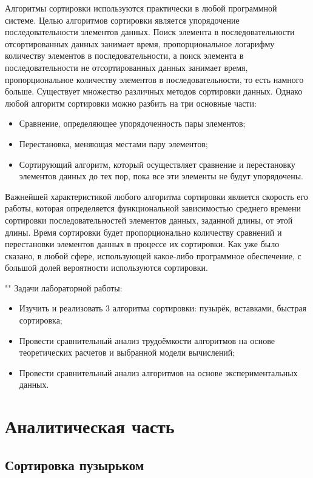 \documentclass[12pt]{report}
\begin{document}
Алгоритмы сортировки используются практически в любой программной системе. Целью алгоритмов сортировки является упорядочение последовательности элементов данных. Поиск элемента в последовательности отсортированных данных занимает время, пропорциональное логарифму количеству элементов в последовательности, а поиск элемента в последовательности не отсортированных данных занимает время, пропорциональное количеству элементов в последовательности, то есть намного больше. Существует множество различных методов сортировки данных. Однако любой алгоритм сортировки можно разбить на три основные части:

\begin{itemize}
	\item Сравнение, определяющее упорядоченность пары элементов;
	\item Перестановка, меняющая местами пару элементов;
	\item Сортирующий алгоритм, который осуществляет сравнение и перестановку элементов данных до тех пор, пока все эти элементы не будут упорядочены.
\end{itemize}

Важнейшей характеристикой любого алгоритма сортировки является скорость его работы, которая определяется функциональной зависимостью среднего времени сортировки последовательностей элементов данных, заданной длины, от этой длины. Время сортировки будет пропорционально количеству сравнений и перестановки элементов данных в процессе их сортировки. Как уже было сказано, в любой сфере, использующей какое-либо программное обеспечение, с большой долей вероятности используются сортировки.  

""\newline
Задачи лабораторной работы:
\begin{itemize}
	\item Изучить и реализовать 3 алгоритма сортировки: пузырёк, вставками, быстрая сортировка;
	\item Провести сравнительный анализ трудоёмкости алгоритмов на основе теоретических расчетов и выбранной модели вычислений;
	\item Провести сравнительный анализ алгоритмов на основе экспериментальных данных.
\end{itemize}

\chapter{Аналитическая часть}


\section{Сортировка пузырьком}
\end{document}
